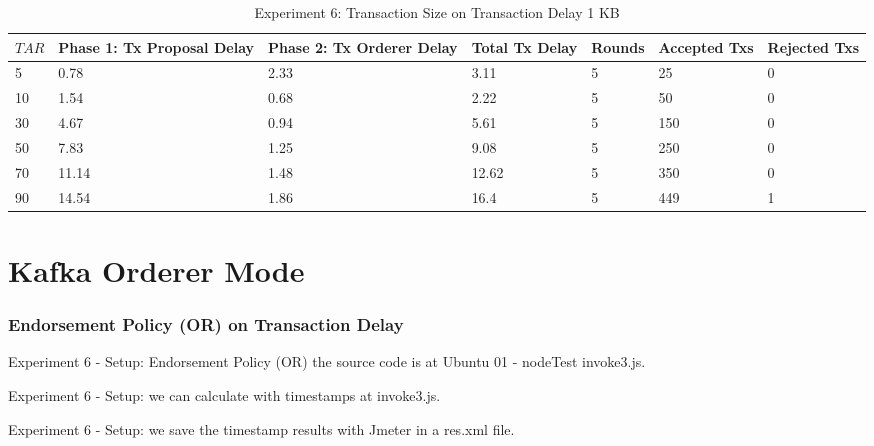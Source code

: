 \documentclass[10pt,journal,compsoc, twoside]{IEEEtran}
\begin{document}
\begin{table*}[htbp]
	\caption{Experiment 6: Transaction Size on Transaction Delay 1 KB}
	\begin{tabular}{|l|l|l|l|l|l|l|}
		\hline
		$TAR$ & Phase 1: Tx Proposal Delay & Phase 2: Tx Orderer Delay & Total Tx Delay & Rounds & Accepted Txs & Rejected Txs \\ \hline
		5     & 0.78                       & 2.33                      & 3.11           & 5      & 25           & 0            \\ \hline
		10    & 1.54                       & 0.68                      & 2.22           & 5      & 50           & 0            \\ \hline
		30    & 4.67                       & 0.94                      & 5.61           & 5      & 150          & 0            \\ \hline
		50    & 7.83                       & 1.25                      & 9.08           & 5      & 250          & 0            \\ \hline
		70    & 11.14                      & 1.48                      & 12.62          & 5      & 350          & 0            \\ \hline
		90    & 14.54                      & 1.86                      & 16.4           & 5      & 449          & 1            \\ \hline
	\end{tabular}
\end{table*}














\section{Kafka Orderer Mode}


\subsubsection{Endorsement Policy (OR) on Transaction Delay}

Experiment 6 - Setup: Endorsement Policy (OR) the source code is at Ubuntu 01 - nodeTest invoke3.js.

Experiment 6 - Setup: we can calculate with timestamps at invoke3.js.

Experiment 6 - Setup: we save the timestamp results with Jmeter in a res.xml file.
\end{document}
